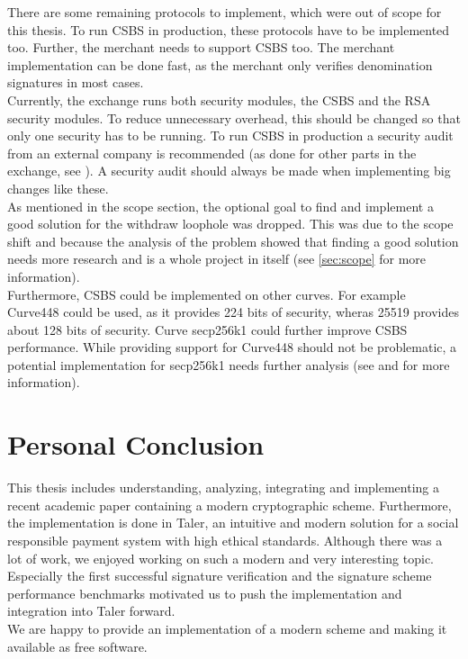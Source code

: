 There are some remaining protocols to implement, which were out of scope for this thesis. 
To run \gls{CSBS} in production, these protocols have to be implemented too.
Further, the merchant needs to support \gls{CSBS} too.
The merchant implementation can be done fast, as the merchant only verifies denomination signatures in most cases. \\
Currently, the exchange runs both security modules, the \gls{CSBS} and the RSA security modules.
To reduce unnecessary overhead, this should be changed so that only one security has to be running.
To run \gls{CSBS} in production a security audit from an external company is recommended (as done for other parts in the exchange, see \cite{codeblau:taler-audit}).
A security audit should always be made when implementing big changes like these.\\
As mentioned in the scope section, the optional goal to find and implement a good solution for the withdraw loophole was dropped.
This was due to the scope shift and because the analysis of the problem showed that finding a good solution needs more research and is a whole project in itself (see \ref{sec:scope} for more information).\\
Furthermore, \gls{CSBS} could be implemented on other curves.
For example Curve448 \cite{cryptoeprint:2015:625} could be used, as it provides 224 bits of security, wheras \gls{25519} \cite{bern:curve25519} provides about 128 bits of security.
Curve secp256k1 could further improve \gls{CSBS} performance.
While providing support for Curve448 should not be problematic, a potential implementation for secp256k1 needs further analysis (see \cite{bernlange:safecurves} and \cite{bip:schnorr-bitc} for more information).

\section{Personal Conclusion}
This thesis includes understanding, analyzing, integrating and implementing a recent academic paper \cite{cryptoeprint:2019:877} containing a modern cryptographic scheme.
Furthermore, the implementation is done in Taler, an intuitive and modern solution for a social responsible payment system with high ethical standards.
Although there was a lot of work, we enjoyed working on such a modern and very interesting topic.
Especially the first successful signature verification and the signature scheme performance benchmarks motivated us to push the implementation and integration into Taler forward.\\
We are happy to provide an implementation of a modern scheme and making it available as free software.